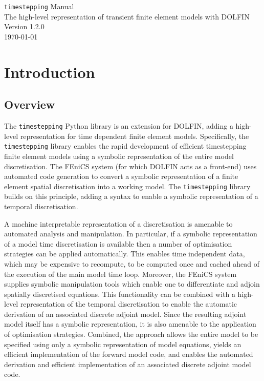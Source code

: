 \documentclass[a4paper]{book}
\newcommand{\version}{1.2.0}
\begin{document}
\begin{titlepage}
\begin{center}

\Huge{\verb+timestepping+ Manual} \\[0.02\textheight]
\large{The high-level representation of transient finite element models with DOLFIN} \\[0.02\textheight]
\Huge{Version \version} \\[0.15\textheight]
\vfill
\large{\today}

\end{center}
\end{titlepage}

\tableofcontents

\chapter{Introduction}

\section{Overview}

The \verb+timestepping+ Python library is an extension for DOLFIN, adding a
high-level representation for time dependent finite element models.
Specifically, the \verb+timestepping+ library enables the rapid development of
efficient timestepping finite element models using a symbolic representation of
the entire model discretisation. The FEniCS system (for which DOLFIN acts as a
front-end) uses automated code generation to convert a symbolic representation
of a finite element spatial discretisation into a working model. The
\verb+timestepping+ library builds on this principle, adding a syntax to enable
a symbolic representation of a temporal discretisation.

A machine interpretable representation of a discretisation is amenable to
automated analysis and manipulation. In particular, if a symbolic representation
of a model time discretisation is available then a number of optimisation
strategies can be applied automatically. This enables time independent data,
which may be expensive to recompute, to be computed once and cached ahead of the
execution of the main model time loop. Moreover, the FEniCS system supplies
symbolic manipulation tools which enable one to differentiate and adjoin
spatially discretised equations. This functionality can be combined with a
high-level representation of the temporal discretisation to enable the automatic
derivation of an associated discrete adjoint model. Since the resulting adjoint
model itself has a symbolic representation, it is also amenable to the
application of optimisation strategies. Combined, the approach allows the entire
model to be specified using only a symbolic representation of model equations,
yields an efficient implementation of the forward model code, and enables the
automated derivation and efficient implementation of an associated discrete
adjoint model code.
\end{document}
